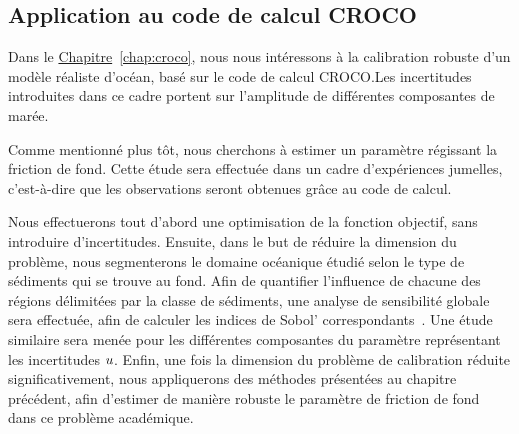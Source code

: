 \documentclass[../../Main_ManuscritThese.tex]{subfiles}
\newcommand{\frchap}[1]{\hyperref[#1]{Chapitre}~\ref{#1}}
\begin{document}
\subsection*{Application au code de calcul CROCO}
Dans le \frchap{chap:croco}, nous nous intéressons à la calibration
robuste d'un modèle réaliste d'océan, basé sur le code de calcul
CROCO.\@ Les incertitudes introduites dans ce cadre portent sur
l'amplitude de différentes composantes de marée.

Comme mentionné plus tôt, nous cherchons à estimer un paramètre
régissant la friction de fond. Cette étude sera effectuée dans un
cadre d'expériences jumelles, c'est-à-dire que les observations seront
obtenues grâce au code de calcul.

Nous effectuerons tout d'abord une optimisation de la fonction
objectif, sans introduire d'incertitudes. Ensuite, dans le but de
réduire la dimension du problème, nous segmenterons le domaine
océanique étudié selon le type de sédiments qui se trouve au
fond. Afin de quantifier l'influence de chacune des régions délimitées
par la classe de sédiments, une analyse de sensibilité globale sera
effectuée, afin de calculer les indices de Sobol'
correspondants~\cite{sobol_global_2001,iooss_revue_2011}. Une étude
similaire sera menée pour les différentes composantes du paramètre
représentant les incertitudes $u$.
Enfin, une fois la dimension du problème de calibration réduite
significativement, nous appliquerons des méthodes présentées au
chapitre précédent, afin d'estimer de manière robuste le paramètre de
friction de fond dans ce problème académique.

\markchapterend




\subfileLocal{
	\pagestyle{empty}
	
	
}
\end{document}
